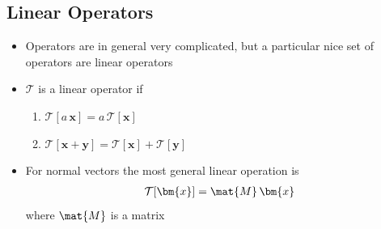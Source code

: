 
\begin{slide}
\section{Linear Operators}

\begin{PauseHighLight}
  \begin{itemize}
  \item Operators are in general very complicated, but a particular nice set
    of operators are linear operators\pause
  \item $\mathcal{T}$ is a linear operator if
    \begin{enumerate}
    \item $\mathcal{T}[a\,\bm{x}] = a\,\mathcal{T}[\bm{x}]$
    \item $\mathcal{T}[\bm{x} + \bm{y}] = \mathcal{T}[\bm{x}] +
      \mathcal{T}[\bm{y}]$\pause
    \end{enumerate}
  \item For normal vectors the most general linear operation is
    \begin{align*}
      \mathcal{T}[\bm{x}] = \mat{M}\,\bm{x}
    \end{align*}
  where $\mat{M}$ is a matrix\pause
  \end{itemize}
\end{PauseHighLight}

\end{slide}


